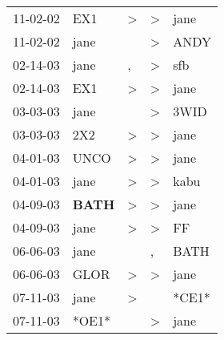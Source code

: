 \begin{supertabular}{p{0.07\textwidth}p{0.06\textwidth}p{0.02\textwidth}p{0.02\textwidth}p{0.06\textwidth}}
          11-02-02\textsuperscript{} &            EX1\textsuperscript{} &     \textgreater &     \textgreater &           jane\textsuperscript{} \\
          11-02-02\textsuperscript{} &           jane\textsuperscript{} &                  &     \textgreater &           ANDY\textsuperscript{} \\
          02-14-03\textsuperscript{} &           jane\textsuperscript{} &                , &     \textgreater &            sfb\textsuperscript{} \\
          02-14-03\textsuperscript{} &            EX1\textsuperscript{} &     \textgreater &     \textgreater &           jane\textsuperscript{} \\
          03-03-03\textsuperscript{} &           jane\textsuperscript{} &                  &     \textgreater &           3WID\textsuperscript{} \\
          03-03-03\textsuperscript{} &            2X2\textsuperscript{} &     \textgreater &     \textgreater &           jane\textsuperscript{} \\
          04-01-03\textsuperscript{} &           UNCO\textsuperscript{} &     \textgreater &     \textgreater &           jane\textsuperscript{} \\
          04-01-03\textsuperscript{} &           jane\textsuperscript{} &     \textgreater &     \textgreater &           kabu\textsuperscript{} \\
          04-09-03\textsuperscript{} &  \textbf{BATH\textsuperscript{}} &     \textgreater &     \textgreater &           jane\textsuperscript{} \\
          04-09-03\textsuperscript{} &           jane\textsuperscript{} &     \textgreater &     \textgreater &             FF\textsuperscript{} \\
          06-06-03\textsuperscript{} &           jane\textsuperscript{} &                  &                , &           BATH\textsuperscript{} \\
          06-06-03\textsuperscript{} &           GLOR\textsuperscript{} &     \textgreater &     \textgreater &           jane\textsuperscript{} \\
          07-11-03\textsuperscript{} &           jane\textsuperscript{} &     \textgreater &                  &                            *CE1* \\
          07-11-03\textsuperscript{} &                            *OE1* &                  &     \textgreater &           jane\textsuperscript{} \\

\end{supertabular}
